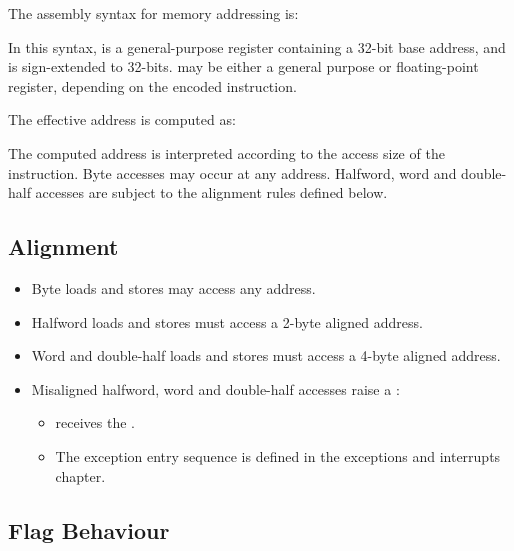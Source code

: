 The assembly syntax for memory addressing is:

\begin{center}
\end{center}

\noindent
In this syntax,  is a general-purpose register containing a 32-bit
base address, and  is sign-extended to 32-bits.  may
be either a general purpose or floating-point register, depending on the
encoded instruction.

\noindent
The effective address is computed as:

\begin{center}
\end{center}

\noindent
The computed address is interpreted according to the access size of the
instruction. Byte accesses may occur at any address. Halfword, word and
double-half accesses are subject to the alignment rules defined below.

\subsection{Alignment}

\begin{itemize}
\item Byte loads and stores may access any address.
\item Halfword loads and stores must access a 2-byte aligned address.
\item Word and double-half loads and stores must access a 4-byte aligned
      address.
\item Misaligned halfword, word and double-half accesses raise a
      :
      \begin{itemize}
      \item {} receives the .
      \item The exception entry sequence is defined in the exceptions and
            interrupts chapter.
      \end{itemize}
\end{itemize}

\subsection{Flag Behaviour}

